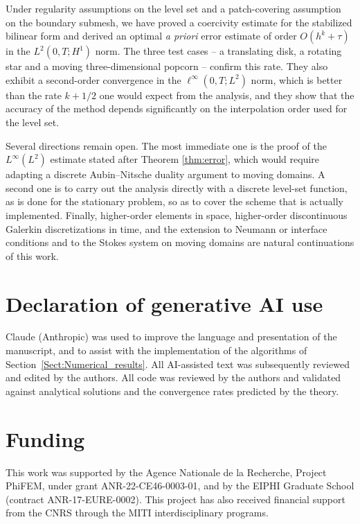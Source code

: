 \documentclass[11pt,a4paper]{article}
\theoremstyle{plain}
\theoremstyle{definition}
\theoremstyle{remark}
\numberwithin{equation}{section}
\begin{document}
Under regularity assumptions on the level set and a patch-covering assumption on the boundary submesh, we have proved a coercivity estimate for the stabilized bilinear form and derived an optimal \emph{a priori} error estimate of order $O(h^k+\tau)$ in the $L^2(0,T;H^1)$ norm. The three test cases -- a translating disk, a rotating star and a moving three-dimensional popcorn -- confirm this rate. They also exhibit a second-order convergence in the $\ell^\infty(0,T;L^2)$ norm, which is better than the rate $k+1/2$ one would expect from the analysis, and they show that the accuracy of the method depends significantly on the interpolation order used for the level set.

Several directions remain open. The most immediate one is the proof of the $L^{\infty}(L^2)$ estimate stated after Theorem \ref{thm:error}, which would require adapting a discrete Aubin--Nitsche duality argument to moving domains. A second one is to carry out the analysis directly with a discrete level-set function, as is done for the stationary problem, so as to cover the scheme that is actually implemented. Finally, higher-order elements in space, higher-order discontinuous Galerkin discretizations in time, and the extension to Neumann or interface conditions and to the Stokes system on moving domains are natural continuations of this work.

\section*{Declaration of generative AI use}
Claude (Anthropic) was used to improve the language and presentation of the manuscript, and to assist with the implementation of the algorithms of Section~\ref{Sect:Numerical_results}. All AI-assisted text was subsequently reviewed and edited by the authors. All code was reviewed by the authors and validated against analytical solutions and the convergence rates predicted by the theory. 

\section*{Funding}
This work was supported by the Agence Nationale de la Recherche, Project PhiFEM, under grant ANR-22-CE46-0003-01, and by the EIPHI Graduate School (contract ANR-17-EURE-0002).
This project has also received financial support from the CNRS through the MITI interdisciplinary programs.

%


\end{document}

